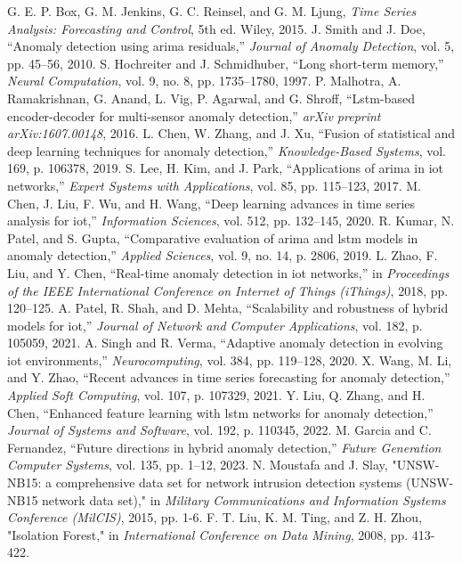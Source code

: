 \documentclass[conference]{IEEEtran}
\begin{document}
\begin{thebibliography}{00}
 G. E. P. Box, G. M. Jenkins, G. C. Reinsel, and G. M. Ljung, \textit{Time Series Analysis: Forecasting and Control}, 5th ed. Wiley, 2015.
 J. Smith and J. Doe, ``Anomaly detection using arima residuals,'' \textit{Journal of Anomaly Detection}, vol. 5, pp. 45–56, 2010.
 S. Hochreiter and J. Schmidhuber, ``Long short-term memory,'' \textit{Neural Computation}, vol. 9, no. 8, pp. 1735–1780, 1997.
 P. Malhotra, A. Ramakrishnan, G. Anand, L. Vig, P. Agarwal, and G. Shroff, ``Lstm-based encoder-decoder for multi-sensor anomaly detection,'' \textit{arXiv preprint arXiv:1607.00148}, 2016.
 L. Chen, W. Zhang, and J. Xu, ``Fusion of statistical and deep learning techniques for anomaly detection,'' \textit{Knowledge-Based Systems}, vol. 169, p. 106378, 2019.
 S. Lee, H. Kim, and J. Park, ``Applications of arima in iot networks,'' \textit{Expert Systems with Applications}, vol. 85, pp. 115–123, 2017.
 M. Chen, J. Liu, F. Wu, and H. Wang, ``Deep learning advances in time series analysis for iot,'' \textit{Information Sciences}, vol. 512, pp. 132–145, 2020.
 R. Kumar, N. Patel, and S. Gupta, ``Comparative evaluation of arima and lstm models in anomaly detection,'' \textit{Applied Sciences}, vol. 9, no. 14, p. 2806, 2019.
 L. Zhao, F. Liu, and Y. Chen, ``Real-time anomaly detection in iot networks,'' in \textit{Proceedings of the IEEE International Conference on Internet of Things (iThings)}, 2018, pp. 120–125.
 A. Patel, R. Shah, and D. Mehta, ``Scalability and robustness of hybrid models for iot,'' \textit{Journal of Network and Computer Applications}, vol. 182, p. 105059, 2021.
 A. Singh and R. Verma, ``Adaptive anomaly detection in evolving iot environments,'' \textit{Neurocomputing}, vol. 384, pp. 119–128, 2020.
 X. Wang, M. Li, and Y. Zhao, ``Recent advances in time series forecasting for anomaly detection,'' \textit{Applied Soft Computing}, vol. 107, p. 107329, 2021.
 Y. Liu, Q. Zhang, and H. Chen, ``Enhanced feature learning with lstm networks for anomaly detection,'' \textit{Journal of Systems and Software}, vol. 192, p. 110345, 2022.
 M. Garcia and C. Fernandez, ``Future directions in hybrid anomaly detection,'' \textit{Future Generation Computer Systems}, vol. 135, pp. 1–12, 2023.
 N. Moustafa and J. Slay, "UNSW-NB15: a comprehensive data set for network intrusion detection systems (UNSW-NB15 network data set)," in \textit{Military Communications and Information Systems Conference (MilCIS)}, 2015, pp. 1-6.
 F. T. Liu, K. M. Ting, and Z. H. Zhou, "Isolation Forest," in \textit{International Conference on Data Mining}, 2008, pp. 413-422.
\end{thebibliography}
\end{document}
